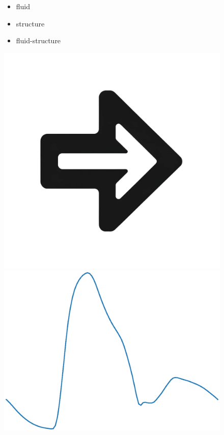 \documentclass{beamer}
\begin{document}
\begin{frame}
\begin{figure}[htbp]
\begin{minipage}[c][0.35\paperheight][c]{\linewidth}
\begin{minipage}{0.1\linewidth}
			\end{minipage}
			\begin{minipage}{0.19\linewidth}
				{\footnotesize
					\begin{itemize} 
						\item fluid 
						\item structure 
						\item fluid-structure
				\end{itemize}}
		\end{minipage}
			\begin{minipage}{0.1\linewidth}
				\includegraphics[width=\linewidth]{images/right_arrow.png}
			\end{minipage}
			\begin{minipage}{0.19\linewidth}
				\includegraphics[width=\linewidth]{images/adan56_tibiofibular_trunk_L_P.eps}

\end{minipage}
\end{minipage}
\end{figure}
\end{frame}
\end{document}
